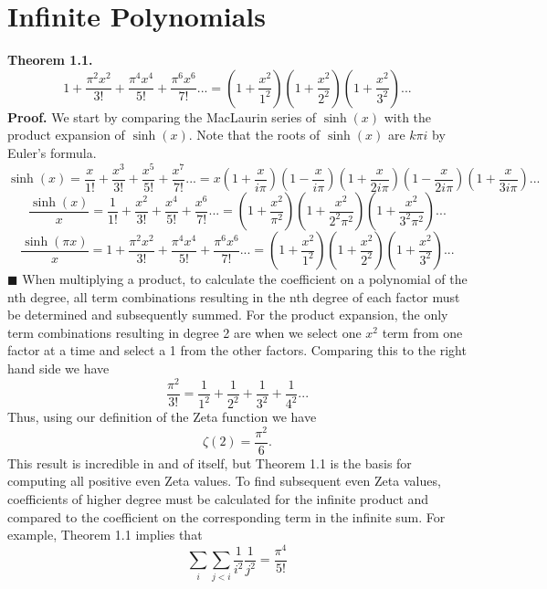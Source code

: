 \documentclass[12pt]{article}
\begin{document}
\section{Infinite Polynomials}
\textbf{Theorem 1.1.}
\[1+\frac{\pi^2x^2}{3!}+\frac{\pi^4x^4}{5!}+\frac{\pi^6x^6}{7!}...=\left(1+\frac{x^2}{1^2}\right)\left(1+\frac{x^2}{2^2}\right)\left(1+\frac{x^2}{3^2}\right)...\]
\textbf{Proof.} \newline
We start by comparing the MacLaurin series of \(\sinh(x)\) with the product expansion of \(\sinh(x)\). Note that the roots of \(\sinh(x)\) are \(k\pi i\) by Euler's formula.
\[\sinh(x)=\frac{x}{1!} + \frac{x^3}{3!} + \frac{x^5}{5!} + \frac{x^7}{7!}... =x\left(1+\frac{x}{i\pi}\right)\left(1-\frac{x}{i\pi}\right)\left(1+\frac{x}{2i\pi}\right)\left(1-\frac{x}{2i\pi}\right)\left(1+\frac{x}{3i\pi}\right)...\]
\[\frac{\sinh(x)}{x}=\frac{1}{1!} + \frac{x^2}{3!} + \frac{x^4}{5!} + \frac{x^6}{7!}...=\left(1+\frac{x^2}{\pi^2}\right)\left(1+\frac{x^2}{2^2\pi^2}\right)\left(1+\frac{x^2}{3^2\pi^2}\right)...\]
\[\frac{\sinh(\pi x)}{x}=1+\frac{\pi^2x^2}{3!}+\frac{\pi^4x^4}{5!}+\frac{\pi^6x^6}{7!}...=\left(1+\frac{x^2}{1^2}\right)\left(1+\frac{x^2}{2^2}\right)\left(1+\frac{x^2}{3^2}\right)...\]
\(\blacksquare\)
\newline
When multiplying a product, to calculate the coefficient on a polynomial of the nth degree, all term combinations resulting in the nth degree of each factor must be determined and subsequently summed. \newline
\newline
For the product expansion, the only term combinations resulting in degree 2 are when we select one \(x^2\) term from one factor at a time and select a 1 from the other factors. Comparing this to the right hand side we have
\[\frac{\pi^2}{3!}=\frac{1}{1^2}+\frac{1}{2^2}+\frac{1}{3^2}+\frac{1}{4^2}...\]
Thus, using our definition of the Zeta function we have
\[\zeta(2)=\frac{\pi^2}{6}.\]
This result is incredible in and of itself, but Theorem 1.1 is the basis for computing all positive even Zeta values.
\newline
\newline
To find subsequent even Zeta values, coefficients of higher degree must be calculated for the infinite product and compared to the coefficient on the corresponding term in the infinite sum. \newline
\newline
For example, Theorem 1.1 implies that
\[\sum_i\sum_{j<i}\frac{1}{i^2}\frac{1}{j^2}=\frac{\pi^4}{5!}\]
\newpage
\end{document}

